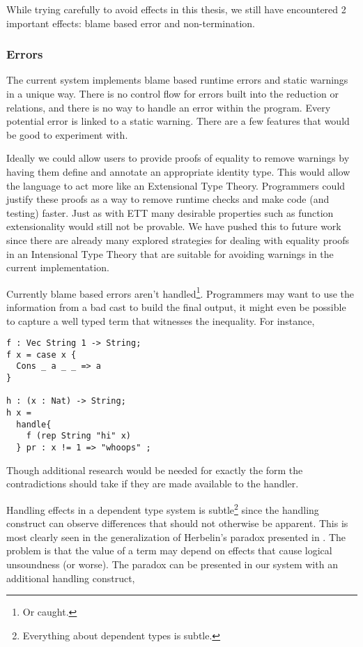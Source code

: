 While trying carefully to avoid effects in this thesis, we still have encountered 2 important effects: blame based error and non-termination.

\subsubsection{Errors}

The current system implements blame based runtime errors and static warnings in a unique way.
There is no control flow for errors built into the reduction or \cbv{} relations, and there is no way to handle an error within the program.
Every potential error is linked to a static warning.
There are a few features that would be good to experiment with.

Ideally we could allow users to provide proofs of equality to remove warnings by having them define and annotate an appropriate identity type.
This would allow the language to act more like an Extensional Type Theory.
Programmers could justify these proofs as a way to remove runtime checks and make code (and testing) faster.
Just as with \ac{ETT} many desirable properties such as function extensionality would still not be provable.
We have pushed this to future work since there are already many explored strategies for dealing with equality proofs in an Intensional Type Theory that are suitable for avoiding warnings in the current implementation.

Currently blame based errors aren't handled\footnote{Or caught.}.
Programmers may want to use the information from a bad cast to build the final output, it might even be possible to capture a well typed term that witnesses the inequality.
For instance,
\begin{lstlisting}
f : Vec String 1 -> String;
f x = case x {
  Cons _ a _ _ => a
}

h : (x : Nat) -> String;
h x =
  handle{
    f (rep String "hi" x)
  } pr : x != 1 => "whoops" ;
\end{lstlisting}

Though additional research would be needed for exactly the form the contradictions should take if they are made available to the handler.

Handling effects in a dependent type system is subtle\footnote{
  Everything about dependent types is subtle.
} since the handling construct can observe differences that should not otherwise be apparent.
This is most clearly seen in the generalization of Herbelin's paradox presented in \cite{10.1145/3371126}.
The problem is that the value of a \Bool{} term may depend on effects that cause logical unsoundness (or worse).
The paradox can be presented in our system with an additional handling construct,


